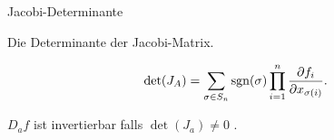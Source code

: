 \documentclass[class=article, crop=false]{standalone}
\begin{document}
\begin{zettel}{Jacobi-Determinante}
\begin{flashcard}
	\begin{definition}
		Die Determinante der Jacobi-Matrix.
	\end{definition}
	\[
		\det(J_A) = \sum_{\sigma \in  S_n } \operatorname{sgn}(\sigma) \prod_{i = 1}^{n} \frac{\partial f_i}{\partial x_{\sigma(i)}}
	.\]
\end{flashcard}
\begin{remark}
	$D_a f$ ist invertierbar falls $\det(J_a) \neq 0$ .
\end{remark}
\end{zettel}
\end{document}
